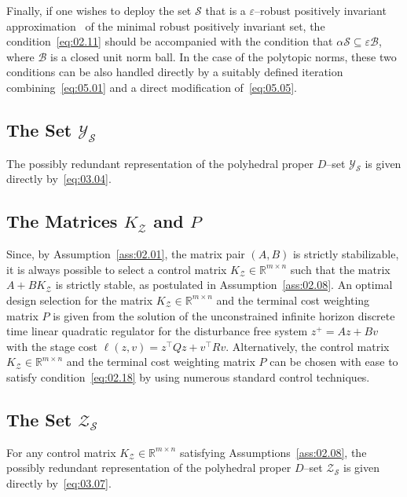\documentclass[twocolumn]{autart}
\newcommand{\mb}[1]{\mathbb{#1}}
\newcommand{\mc}[1]{\mathcal{#1}}
\newcommand{\R}{\mb{R}}
\newcommand{\Rnm}[2]{\R^{{#1}\times{#2}}}
\numberwithin{equation}{section}
\begin{document}
Finally, if one wishes to deploy the set $\mc{S}$ that is a $\varepsilon$--robust positively invariant approximation~\cite{rakovic:kerrigan:kouramas:mayne:2004b} of the minimal robust positively invariant set, the condition~\eqref{eq:02.11} should be accompanied with the condition that $\alpha \mc{S}\subseteq \varepsilon \mc{B}$, where $\mc{B}$ is a closed unit norm ball. In the case of the polytopic norms, these two conditions can be also handled directly by  a suitably defined iteration combining~\eqref{eq:05.01} and a direct modification of~\eqref{eq:05.05}.

\subsection{The Set $\mc{Y}_\mc{S}$}
\label{sec:05.03}
The possibly redundant representation of the polyhedral proper $D$--set $\mc{Y}_\mc{S}$ is given directly by~\eqref{eq:03.04}. 

\subsection{The Matrices $K_\mc{Z}$ and $P$}
\label{sec:05.04}

Since, by Assumption~\ref{ass:02.01}, the matrix pair $(A,B)$ is strictly stabilizable, it is always possible to select a control matrix $K_\mc{Z}\in\Rnm{m}{n}$ such that the matrix $A+BK_\mc{Z}$ is strictly stable, as postulated in Assumption~\ref{ass:02.08}. An optimal design selection for the matrix $K_\mc{Z}\in\Rnm{m}{n}$ and the terminal cost weighting matrix $P$ is given from the solution of the unconstrained infinite horizon discrete time linear quadratic regulator for the disturbance free system $z^+=Az+Bv$ with the stage cost $\ell(z,v)=z^\top Q z+v^\top R v$. Alternatively, the control matrix $K_\mc{Z}\in\Rnm{m}{n}$ and the terminal cost weighting matrix $P$ can be chosen with ease to satisfy condition~\eqref{eq:02.18} by using numerous standard control techniques. 


\subsection{The Set $\mc{Z}_\mc{S}$}
\label{sec:05.05}
For any control matrix $K_\mc{Z}\in\Rnm{m}{n}$ satisfying Assumptions~\ref{ass:02.08}, the possibly redundant representation of the polyhedral proper $D$--set $\mc{Z}_\mc{S}$ is given directly by~\eqref{eq:03.07}.
\end{document}
